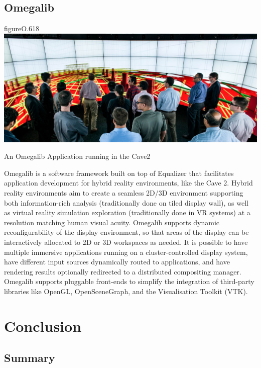 \section{Omegalib}

\begin{wrapfloat}{figure}{O}{.618\textwidth}
  \includegraphics[width=.618\textwidth]{images/omegalib}
  {\caption{\label{fOmegalib}An Omegalib Application running in the Cave2}}
\end{wrapfloat}

Omegalib \cite{Omegalib} is a software framework built on top of Equalizer that
facilitates application development for hybrid reality environments, like the
Cave 2. Hybrid reality environments aim to create a seamless 2D/3D environment
supporting both information-rich analysis (traditionally done on tiled
display wall), as well as virtual reality simulation exploration (traditionally
done in VR systems) at a resolution matching human visual acuity. Omegalib
supports dynamic reconfigurability of the display environment, so that areas of
the display can be interactively allocated to 2D or 3D workspaces as needed. It
is possible to have multiple immersive applications running on a
cluster-controlled display system, have different input sources dynamically
routed to applications, and have rendering results optionally redirected to a
distributed compositing manager. Omegalib supports pluggable front-ends to
simplify the integration of third-party libraries like OpenGL, OpenSceneGraph,
and the Visualisation Toolkit (VTK).


\chapter{Conclusion}\label{sConclusion}

\section{Summary}

